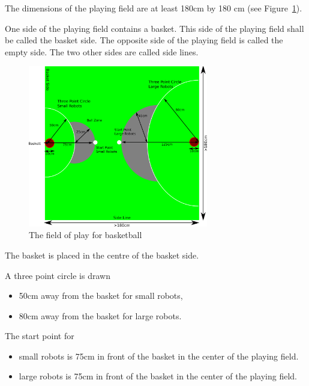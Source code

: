 \documentclass[12pt]{hurocup}
\begin{document}
\begin{lawlist}[BB]

\item The dimensions of the playing field are at least 180cm by
  180 cm (see Figure~\ref{fig:field-basketball}).

\item One side of the playing field contains a basket. This side of the
  playing field shall be called the basket side. The opposite side of
  the playing field is called the empty side. The two other sides are
  called side lines.

  \begin{figure}
    \begin{center}
      \includegraphics[width=0.7\textwidth]{Figures/basketball-field}
    \end{center}
    \caption{The field of play for basketball}
    \label{fig:field-basketball}
  \end{figure}

\item The basket is placed in the centre of the basket side.

\item A three point circle is drawn 
  \begin{itemize}
    \item 50cm away from the basket for small robots,
    \item 80cm away from the basket for large robots.
  \end{itemize}

\item The start point for
  \begin{itemize}
   \item small robots is 75cm in front of the basket in the center of
    the playing field. 
   \item large robots is 75cm in front of the basket in the center of
    the playing field.
  \end{itemize}


\end{lawlist}
\end{document}
